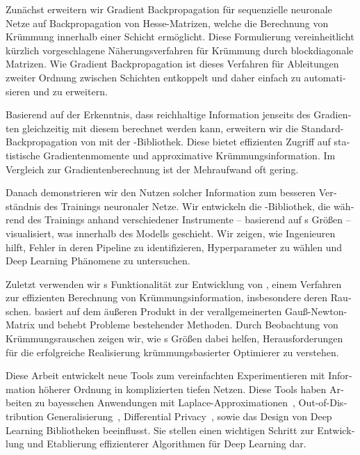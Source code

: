 \begin{otherlanguage}{german}
  Zun\"achst erweitern wir Gradient Backpropagation f\"ur sequenzielle neuronale
  Netze auf Backpropagation von Hesse-Matrizen, welche die Berechnung von
  Kr\"ummung innerhalb einer Schicht erm\"oglicht. Diese Formulierung
  vereinheitlicht k\"urzlich vorgeschlagene N\"aherungsverfahren f\"ur
  Kr\"ummung durch blockdiagonale Matrizen. Wie Gradient Backpropagation ist
  dieses Verfahren f\"ur Ableitungen zweiter Ordnung zwischen Schichten
  entkoppelt und daher einfach zu automatisieren und zu erweitern.

  Basierend auf der Erkenntnis, dass reichhaltige Information jenseits des
  Gradienten gleichzeitig mit diesem berechnet werden kann, erweitern wir die
  Standard-Backpropagation von \pytorch mit der \backpack-Bibliothek. Diese
  bietet effizienten Zugriff auf statistische Gradientenmomente und
  approximative Krümmungsinformation. Im Vergleich zur Gradientenberechnung
  ist der Mehraufwand oft gering.

  Danach demonstrieren wir den Nutzen solcher Information zum besseren
  Verst\"andnis des Trainings neuronaler Netze. Wir entwickeln die
  \cockpit-Bibliothek, die w\"ahrend des Trainings anhand verschiedener
  Instrumente -- basierend auf \backpack{}s Gr\"o\ss{}en -- visualisiert, was
  innerhalb des Modells geschieht. Wir zeigen, wie \cockpit Ingenieuren hilft,
  Fehler in deren Pipeline zu identifizieren, Hyperparameter zu w\"ahlen und
  Deep Learning Ph\"anomene zu untersuchen.

  Zuletzt verwenden wir \backpack{}s Funktionalit\"at zur Entwicklung von
  \vivit, einem Verfahren zur effizienten Berechnung von Kr\"ummungsinformation,
  insbesondere deren Rauschen. \vivit basiert auf dem \"au\ss{}eren Produkt in
  der verallgemeinerten Gau\ss{}-Newton-Matrix und behebt Probleme bestehender
  Methoden. Durch Beobachtung von Kr\"ummungsrauschen zeigen wir, wie \vivit{}s
  Gr\"o\ss{}en dabei helfen, Herausforderungen f\"ur die erfolgreiche
  Realisierung kr\"ummungsbasierter Optimierer zu verstehen.

  Diese Arbeit entwickelt neue Tools zum vereinfachten Experimentieren mit
  Information höherer Ordnung in komplizierten tiefen Netzen. Diese Tools haben
  Arbeiten zu bayesschen Anwendungen mit
  Laplace-Approximationen~\cite{daxberger2021laplace}, Out-of-Distribution
  Generalisierung~\cite{gulrajani2021in,rame2022fishr}, Differential
  Privacy~\cite{yousefpour2021opacus}, sowie das Design von Deep Learning
  Bibliotheken beeinflusst. Sie stellen einen wichtigen Schritt zur Entwicklung
  und Etablierung effizienterer Algorithmen f\"ur Deep Learning dar.

\end{otherlanguage}

